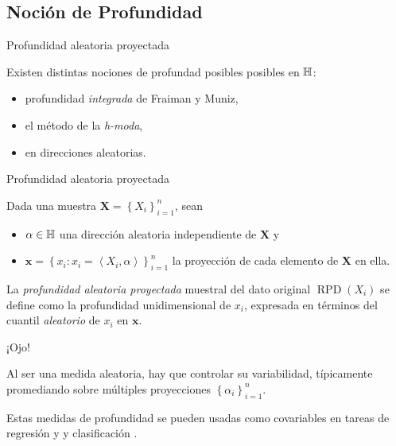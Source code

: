 \documentclass[10pt,spanish]{beamer}\usepackage[]{graphicx}\usepackage[]{color}
\begin{document}
\subsection[Profundidad aleatoria]{Noción de Profundidad}
\begin{frame}{Profundidad aleatoria proyectada}

Existen distintas nociones de profundad posibles posibles en $\mathbb{H}$:

\pause{}
\begin{itemize}
\item profundidad \emph{integrada} de Fraiman y Muniz,
\end{itemize}

\pause{}
\begin{itemize}
\item el método de la \emph{h-moda},
\end{itemize}

\pause{}
\begin{itemize}
\item en direcciones aleatorias.
\end{itemize}
\end{frame}
%
\begin{frame}{Profundidad aleatoria proyectada}

Dada una muestra $\mathbf{X}=\left\{ X_{i}\right\} _{i=1}^{n}$, sean
\begin{itemize}
\item $\alpha\in\mathbb{H}$ una dirección aleatoria independiente de $\mathbf{X}$
y
\end{itemize}

\pause{}
\begin{itemize}
\item $\mathbf{x}=\left\{ x_{i}:x_{i}=\left\langle X_{i},\alpha\right\rangle \right\} _{i=1}^{n}$
la proyección de cada elemento de $\mathbf{X}$ en ella.
\end{itemize}

\pause{}

La \emph{profundidad aleatoria proyectada }muestral del dato original
$\mathop{RPD}\left(X_{i}\right)$ se define como la profundidad unidimensional
de $x_{i}$, expresada en términos del cuantil \emph{aleatorio} de
$x_{i}$ en $\mathbf{x}$.

\pause{}
\begin{alertblock}{¡Ojo!}

Al ser una medida aleatoria, hay que controlar su variabilidad, típicamente
promediando sobre múltiples proyecciones $\left\{ \alpha_{i}\right\} _{i=1}^{n}$.
\end{alertblock}

\pause{}

Estas medidas de profundidad se pueden usadas como covariables en
tareas de regresión \cite{Cuevas 2007} y y clasificación \cite{Cuevas 2007,Cuesta 2017}.
\end{frame}
\end{document}
